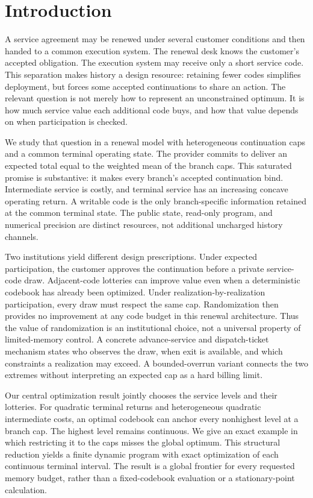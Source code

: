 \section{Introduction}
A service agreement may be renewed under several customer conditions and then handed to a common execution system. The renewal desk knows the customer's accepted obligation. The execution system may receive only a short service code. This separation makes history a design resource: retaining fewer codes simplifies deployment, but forces some accepted continuations to share an action. The relevant question is not merely how to represent an unconstrained optimum. It is how much service value each additional code buys, and how that value depends on when participation is checked.

We study that question in a renewal model with heterogeneous continuation caps and a common terminal operating state. The provider commits to deliver an expected total equal to the weighted mean of the branch caps. This saturated promise is substantive: it makes every branch's accepted continuation bind. Intermediate service is costly, and terminal service has an increasing concave operating return. A writable code is the only branch-specific information retained at the common terminal state. The public state, read-only program, and numerical precision are distinct resources, not additional uncharged history channels.

Two institutions yield different design prescriptions. Under expected participation, the customer approves the continuation before a private service-code draw. Adjacent-code lotteries can improve value even when a deterministic codebook has already been optimized. Under realization-by-realization participation, every draw must respect the same cap. Randomization then provides no improvement at any code budget in this renewal architecture. Thus the value of randomization is an institutional choice, not a universal property of limited-memory control. A concrete advance-service and dispatch-ticket mechanism states who observes the draw, when exit is available, and which constraints a realization may exceed. A bounded-overrun variant connects the two extremes without interpreting an expected cap as a hard billing limit.

Our central optimization result jointly chooses the service levels and their lotteries. For quadratic terminal returns and heterogeneous quadratic intermediate costs, an optimal codebook can anchor every nonhighest level at a branch cap. The highest level remains continuous. We give an exact example in which restricting it to the caps misses the global optimum. This structural reduction yields a finite dynamic program with exact optimization of each continuous terminal interval. The result is a global frontier for every requested memory budget, rather than a fixed-codebook evaluation or a stationary-point calculation.

